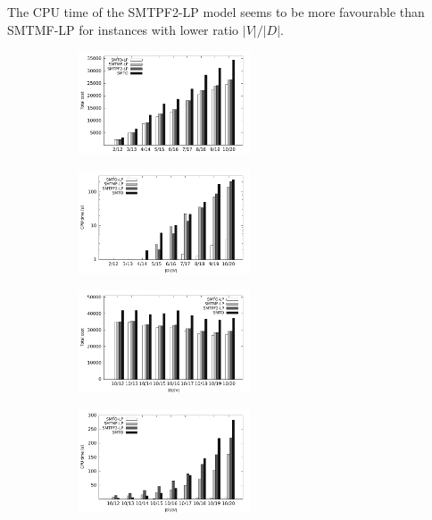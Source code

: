 The CPU time of the SMTPF2-LP model seems to be more favourable than SMTMF-LP for instances with lower ratio $|V|/|D|$. 
\begin{figure}[h!]
    \centering
    \begin{subfigure}[b]{0.5\textwidth}
        \centering
        \includegraphics[height=1.2in]{../graphs/id-basic-cost}
        \caption{}
        \label{fig:id-basic-cost}
    \end{subfigure}%
    \begin{subfigure}[b]{0.5\textwidth}
        \centering
        \includegraphics[height=1.2in]{../graphs/id-basic-time}
        \caption{}
                \label{fig:id-basic-time}
    \end{subfigure}
    \caption{}
    \label{fig:id-basi}
\end{figure}


\begin{figure}[h!]
    \centering
    \begin{subfigure}[b]{0.5\textwidth}
        \centering
        \includegraphics[height=1.2in]{../graphs/in-basic-cost}
        \caption{}
        \label{fig:in-basic-cost}
    \end{subfigure}%
    \begin{subfigure}[b]{0.5\textwidth}
        \centering
        \includegraphics[height=1.2in]{../graphs/in-basic-time}
        \caption{}
                \label{fig:in-basic-time}
    \end{subfigure}
    \caption{}
    \label{fig:in-basic}
\end{figure}


